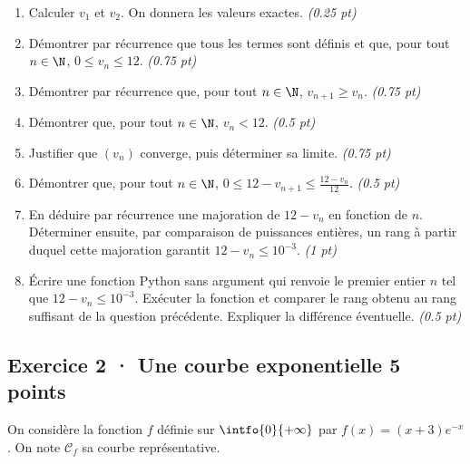 \begin{enumerate}

\item Calculer $v_1$ et $v_2$. On donnera les valeurs exactes. \hfill\textit{(\num{0,25} pt)}

\item Démontrer par récurrence que tous les termes sont définis et que, pour tout $n\in\N$, $0\le v_n\le12$. \hfill\textit{(\num{0,75} pt)}

\item Démontrer par récurrence que, pour tout $n\in\N$, $v_{n+1}\ge v_n$. \hfill\textit{(\num{0,75} pt)}

\item Démontrer que, pour tout $n\in\N$, $v_n<12$. \hfill\textit{(\num{0,5} pt)}

\item Justifier que $(v_n)$ converge, puis déterminer sa limite. \hfill\textit{(\num{0,75} pt)}

\item Démontrer que, pour tout $n\in\N$, $0\le 12-v_{n+1}\le\frac{12-v_n}{12}$. \hfill\textit{(\num{0,5} pt)}

\item En déduire par récurrence une majoration de $12-v_n$ en fonction de $n$. Déterminer ensuite, par comparaison de puissances entières, un rang à partir duquel cette majoration garantit $12-v_n\le10^{-3}$. \hfill\textit{(1 pt)}

\item Écrire une fonction Python sans argument qui renvoie le premier entier $n$ tel que $12-v_n\le10^{-3}$. Exécuter la fonction et comparer le rang obtenu au rang suffisant de la question précédente. Expliquer la différence éventuelle. \hfill\textit{(\num{0,5} pt)}

\end{enumerate}

\subsection*{Exercice 2 · Une courbe exponentielle \hfill 5 points}On considère la fonction $f$ définie sur $\intfo{0}{+\infty}$ par $f(x)=(x+3)e^{-x}$. On note $\mathcal C_f$ sa courbe représentative.

